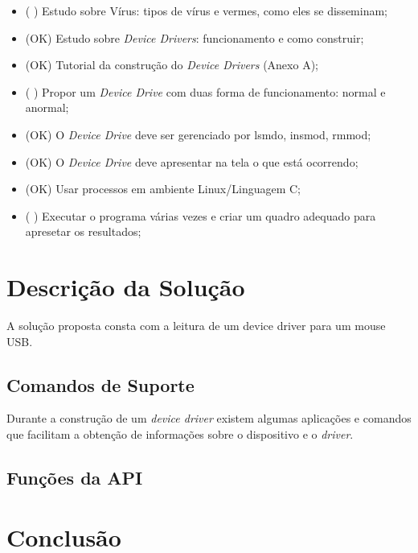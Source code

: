 \begin{itemize}
  \item (  ) Estudo sobre Vírus: tipos de vírus e vermes, como eles se disseminam;
  \item (OK) Estudo sobre \textit{Device Drivers}: funcionamento e como construir;
  \item (OK) Tutorial da construção do \textit{Device Drivers} (Anexo A);
  \item (  ) Propor um \textit{Device Drive} com duas forma de funcionamento: normal e anormal;
  \item (OK) O \textit{Device Drive} deve ser gerenciado por lsmdo, insmod, rmmod;
  \item (OK) O \textit{Device Drive} deve apresentar na tela o que está ocorrendo;
  \item (OK) Usar processos em ambiente Linux/Linguagem C;
  \item (  ) Executar o programa várias vezes e criar um quadro adequado para apresetar os resultados;
\end{itemize}

\section{Descrição da Solução}

A solução proposta consta com a leitura de um device driver para um mouse USB.

\subsection{Comandos de Suporte}
\label{util}
Durante a construção de um \textit{device driver} existem algumas aplicações e comandos que facilitam
a obtenção de informações sobre o dispositivo e o \textit{driver}.


\subsection{Funções da API}



\section{Conclusão}


